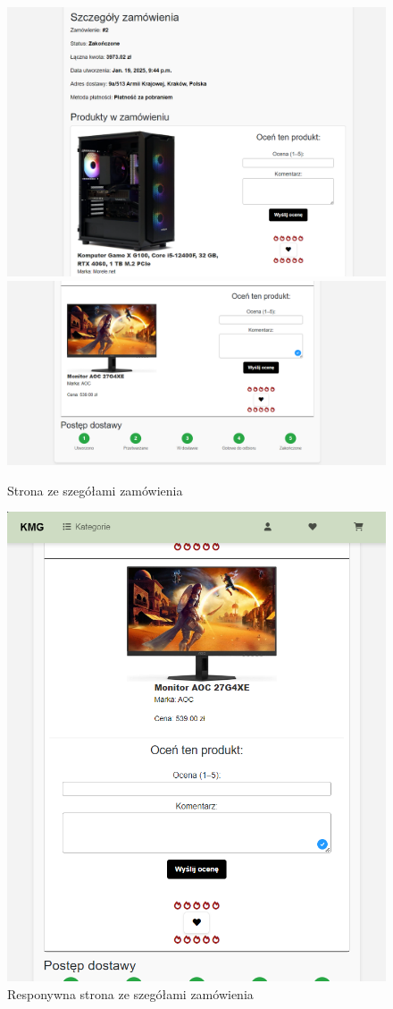 \documentclass[12pt,a4paper,oneside]{article}
\theoremstyle{definition}
\numberwithin{equation}{section}
\begin{document}
\begin{figure}[H]
    \centering
    \includegraphics[width=0.8\columnwidth]{images/krzysztofBImages/szczegóły-zamówieniaV1.png}
    \includegraphics[width=0.8\columnwidth]{images/krzysztofBImages/szczegóły-zamówieniaV2.png}
    \caption{Strona ze szegółami zamówienia}
    \label{szczegóły-zamówienia}
\end{figure}

\begin{figure}[H]
    \centering
    \includegraphics[width=0.5\columnwidth]{images/krzysztofBImages/szczegóły-zamówienia-respo.png}
    \caption{Responywna strona ze szegółami zamówienia}
    \label{szczegóły-zamówienia-respo}
\end{figure}
\end{document}
